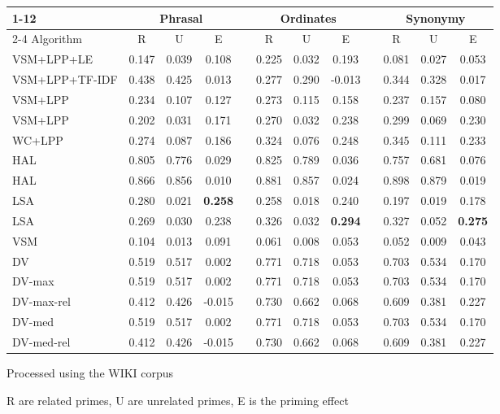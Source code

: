 \documentclass[11pt]{article}
\begin{document}
\begin{table*}[htb]
\begin{threeparttable}
\begin{tabular}{l ccc r ccc r ccc }
 \cmidrule{1-12}
      &
      \multicolumn{3}{c}{Phrasal} &&
      \multicolumn{3}{c}{Ordinates} &&
      \multicolumn{3}{c}{Synonymy} \\
      \cmidrule{2-4}  \cmidrule{6-8} \cmidrule{10-12}
      Algorithm & R & U & E && R & U & E && R & U & E \\
      \midrule
      VSM+LPP+LE &
 0.147 & 0.039 & 0.108 && 0.225 & 0.032 & 0.193 && 0.081 & 0.027 & 0.053  \\
      VSM+LPP+TF-IDF & 
 0.438 & 0.425 & 0.013 && 0.277 & 0.290 & -0.013 && 0.344 & 0.328 & 0.017  \\
      VSM+LPP    & 
 0.234 & 0.107 & 0.127 && 0.273 & 0.115 & 0.158 && 0.237 & 0.157 & 0.080  \\
      VSM+LPP\tnote{a}  &
 0.202 & 0.031 & 0.171 && 0.270 & 0.032 & 0.238 && 0.299 & 0.069 & 0.230  \\
      WC+LPP & 
 0.274 & 0.087 & 0.186 && 0.324 & 0.076 & 0.248 && 0.345 & 0.111 & 0.233  \\
      HAL &
 0.805 & 0.776 & 0.029 && 0.825 & 0.789 & 0.036 && 0.757 & 0.681 & 0.076  \\
      HAL\tnote{a} &
 0.866 & 0.856 & 0.010 && 0.881 & 0.857 & 0.024 && 0.898 & 0.879 & 0.019  \\
      LSA &
0.280 & 0.021 & {\bf 0.258} && 0.258 & 0.018 & 0.240 && 0.197 & 0.019 & 0.178  \\
      LSA\tnote{a} &
0.269 & 0.030 & 0.238 && 0.326 & 0.032 & {\bf 0.294} && 0.327 & 0.052 & {\bf
0.275}  \\
      VSM &
0.104 & 0.013 & 0.091 && 0.061 & 0.008 & 0.053 && 0.052 & 0.009 & 0.043  \\

      DV &
0.519 & 0.517 & 0.002  &&  0.771 & 0.718 & 0.053  &&  0.703 & 0.534 & 0.170  \\
      DV-max &
0.519 & 0.517 & 0.002  &&  0.771 & 0.718 & 0.053  &&  0.703 & 0.534 & 0.170  \\
      DV-max-rel &
0.412 & 0.426 & -0.015  &&  0.730 & 0.662 & 0.068  &&  0.609 & 0.381 & 0.227  \\
      DV-med &
0.519 & 0.517 & 0.002  &&  0.771 & 0.718 & 0.053  &&  0.703 & 0.534 & 0.170  \\
      DV-med-rel &
0.412 & 0.426 & -0.015  &&  0.730 & 0.662 & 0.068  &&  0.609 & 0.381 & 0.227  \\



      \bottomrule

  \end{tabular}
  \begin{tablenotes}
    \item[a] {\footnotesize Processed using the WIKI corpus}
    \item[b] {\footnotesize R are related primes, U are unrelated primes, E is
    the priming effect}
  \end{tablenotes}
  \end{threeparttable}
  \caption{Experiment 1 priming results for the six relation categories from
    Hodgson }
  \label{tab:categorical-priming-b}
\end{table*}
\end{document}
